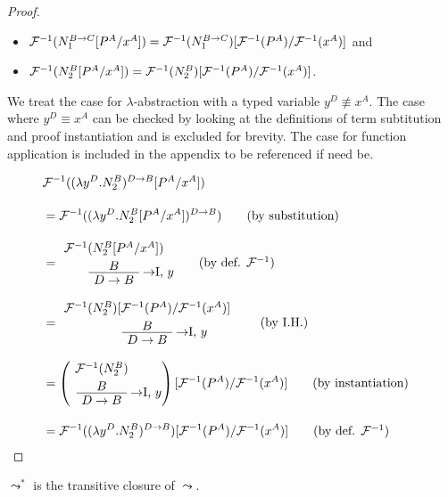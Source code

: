 \begin{proof}
\begin{itemize}
\item $\mathcal{F}^{-1}(N_1^{B \to C}[P^A/x^A])
      = \mathcal{F}^{-1}(N_1^{B \to C})[\mathcal{F}^{-1}(P^A)/\mathcal{F}^{-1}(x^A)]$ and
\item $\mathcal{F}^{-1}(N_2^B[P^A/x^A]) = \mathcal{F}^{-1}(N_2^B)[\mathcal{F}^{-1}(P^A)/\mathcal{F}^{-1}(x^A)]$.
\end{itemize}
We treat the case for $\lambda$-abstraction with a typed variable $y^D \not\equiv
x^A$. The case where $y^D \equiv x^A$ can be checked by looking at the
definitions of term subtitution and proof instantiation and is excluded for
brevity. The case for function application is included in the appendix to be
referenced if need be.

\begin{align*}
\lefteqn{\chmapantasub{(\lambda y^D.N_2^B)^{D \to B}}{P^A}{x^A}} \\[10pt]
  &=
  \chmapanta((\lambda y^D.N_2^B[P^A/x^A])^{D \to B})
  \tag{by substitution}\\[10pt]
  &=
  \implintro{%
    \AxiomC{$\chmapantasub{N_2^B}{P^A}{x^A}$}\noLine\UnaryInfC{$B$}
  }{y}{$D \to B$}
  \DisplayProof \tag{by def. $\chmapanta$}\\[10pt]
  &=
  \implintro{%
    \AxiomC{$\subchmapanta{N_2^B}{P^A}{x^A}$}\noLine\UnaryInfC{$B$}
  }{y}{$D \to B$}
  \DisplayProof \tag{by I.H.}\\[10pt]
  &=
  \left(
  \implintro{%
    \AxiomC{$\chmapanta(N_2^B)$}\noLine\UnaryInfC{$B$}
  }{y}{$D \to B$}
  \DisplayProof
  \right)[\chmapanta(P^A)/\chmapanta(x^A)] \tag{by instantiation} \\[10pt]
  &= \subchmapanta{(\lambda y^D.N_2^B)^{D \to B}}{P^A}{x^A} \tag{by def. $\chmapanta$}
\end{align*}

\end{proof}

\begin{definition}[$\leadsto^*$]
$\leadsto^*$ is the transitive closure of $\leadsto$.
\end{definition}
